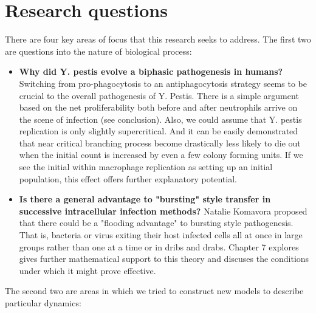 \section{Research questions}

There are four key areas of focus that this research seeks to address. The first two are questions into the nature of biological process:

\begin{itemize}
\item  \textbf{Why did Y. pestis evolve a biphasic pathogenesis in humans?} 
Switching from pro-phagocytosis to an antiphagocytosis strategy seems to be crucial to the overall pathogenesis of Y. Pestis.  There is a simple argument based on the net proliferability both before and after neutrophils arrive on the scene of infection (see conclusion).  Also,  we could assume that Y. pestis replication is only slightly supercritical.  And it can be easily demonstrated that near critical branching process become drastically less likely to die out when the initial count is increased by even a few colony forming units.  If we see the initial within macrophage replication as setting up an initial population,  this effect offers further explanatory potential. 


\item \textbf{Is there a general advantage to "bursting" style transfer in successive intracellular infection methods?}
Natalie Komavora proposed that there could be a "flooding advantage" to bursting style pathogenesis.  That is,  bacteria or virus exiting their host infected cells all at once in large groups rather than one at a time or in dribs and drabs. Chapter 7 explores gives further mathematical support to this theory and discuses the conditions under which it might prove effective.
\end{itemize} 

\noindent
The second two are areas in which we tried to construct new models to describe particular dynamics:

